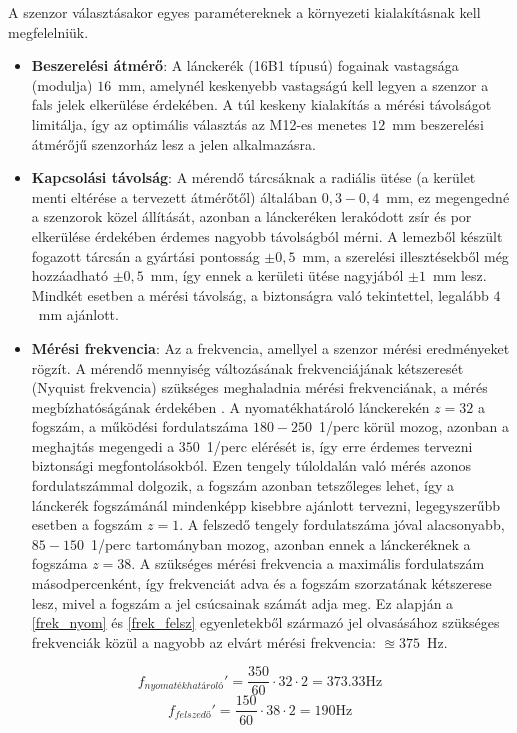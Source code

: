 A szenzor választásakor egyes paramétereknek a környezeti kialakításnak kell megfelelniük. 
\begin{itemize}
	\item \textbf{Beszerelési átmérő}: A lánckerék (16B1 típusú) fogainak vastagsága (modulja) $16$~mm, amelynél keskenyebb vastagságú kell legyen a szenzor a fals jelek elkerülése érdekében. A túl keskeny kialakítás a mérési távolságot limitálja, így az optimális választás az M12-es menetes $12$~mm beszerelési átmérőjű szenzorház lesz a jelen alkalmazásra.
	\item \textbf{Kapcsolási távolság}: A mérendő tárcsáknak a radiális ütése (a kerület menti eltérése a tervezett átmérőtől) általában $0,3-0,4$~mm, ez megengedné a szenzorok közel állítását, azonban a lánckeréken lerakódott zsír és por elkerülése érdekében érdemes nagyobb távolságból mérni. A lemezből készült fogazott tárcsán a gyártási pontosság $\pm0,5$~mm, a szerelési illesztésekből még hozzáadható $\pm0,5$~mm, így ennek a kerületi ütése nagyjából $\pm1$~mm lesz. Mindkét esetben a mérési távolság, a biztonságra való tekintettel, legalább $4$~mm ajánlott.
	\item \textbf{Mérési frekvencia}: Az a frekvencia, amellyel a szenzor mérési eredményeket rögzít. A mérendő mennyiség változásának frekvenciájának kétszeresét (Nyquist frekvencia) szükséges meghaladnia mérési frekvenciának, a mérés megbízhatóságának érdekében \cite{Morris2016d}. A nyomatékhatároló lánckerekén $z=32$ a fogszám, a működési fordulatszáma $180-250$~1/perc körül mozog, azonban a meghajtás megengedi a $350$~1/perc elérését is, így erre érdemes tervezni biztonsági megfontolásokból. Ezen tengely túloldalán való mérés azonos fordulatszámmal dolgozik, a fogszám azonban tetszőleges lehet, így a lánckerék fogszámánál mindenképp kisebbre ajánlott tervezni, legegyszerűbb esetben a fogszám $z=1$. A felszedő tengely fordulatszáma jóval alacsonyabb, $85-150$~1/perc tartományban mozog, azonban ennek a lánckeréknek a fogszáma $z=38$. A szükséges mérési frekvencia a maximális fordulatszám másodpercenként, így frekvenciát adva és a fogszám szorzatának kétszerese lesz, mivel a fogszám a jel csúcsainak számát adja meg. Ez alapján a \ref{frek_nyom} és \ref{frek_felsz} egyenletekből származó jel olvasásához szükséges frekvenciák közül a nagyobb az elvárt mérési frekvencia: $\approxeq375$~Hz.
\end{itemize}
\begin{equation}
	f_{nyomatékhatároló}'=\frac{350}{60}\cdot32\cdot2=373.33\text{Hz}
	\label{frek_nyom}
\end{equation}
\begin{equation}
	f_{felszedő}'=\frac{150}{60}\cdot38\cdot2=190\text{Hz}
	\label{frek_felsz}
\end{equation}

